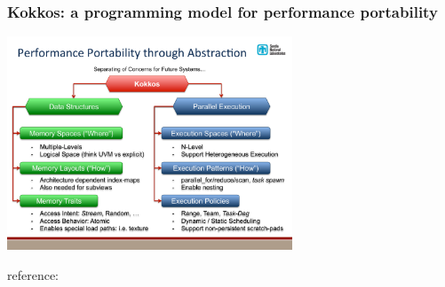 \begin{frame}
  \frametitle{Kokkos: a programming model for performance portability}

  \begin{center}
    \includegraphics[width=8.5cm]{../intro/images/Kokkos-Multi-CoE_slide3}
  \end{center}

  {\small reference: }

\end{frame}

